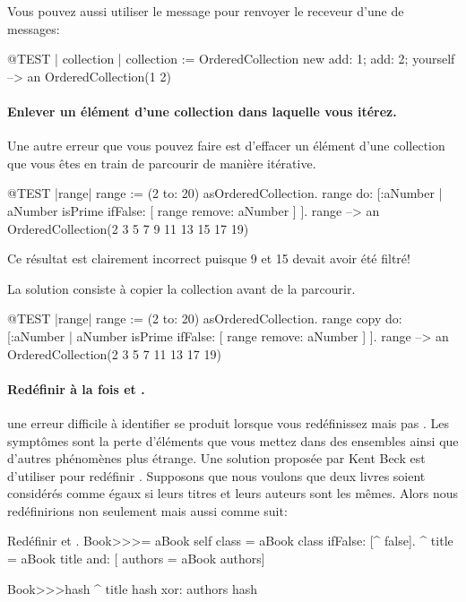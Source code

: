 \documentclass[a4paper,10pt,twoside]{book}
\begin{document}
Vous pouvez aussi utiliser le message  pour
renvoyer le receveur d'une  de messages:

\begin{code}{@TEST | collection |}
collection := OrderedCollection new add: 1; add: 2; yourself --> an OrderedCollection(1 2)
\end{code}

\paragraph{Enlever un \'el\'ement d'une collection dans laquelle vous it\'erez.}
Une autre erreur que vous pouvez faire est d'effacer un \'el\'ement d'une collection que vous \^etes en train de parcourir de mani\`ere it\'erative.
\begin{code}{@TEST |range|}
range := (2 to: 20) asOrderedCollection.
range do: [:aNumber | aNumber isPrime ifFalse: [ range remove: aNumber ] ].
range --> an OrderedCollection(2 3 5 7 9 11 13 15 17 19)
\end{code}
\noindent
Ce r\'esultat est clairement incorrect puisque 9 et 15 devait avoir \'et\'e
filtr\'e!

La solution consiste \`a copier la collection avant de la parcourir.
\begin{code}{@TEST |range|}
range := (2 to: 20) asOrderedCollection.
range copy do: [:aNumber | aNumber isPrime ifFalse: [ range remove: aNumber ] ].
range --> an OrderedCollection(2 3 5 7 11 13 17 19)
\end{code}

\paragraph{Red\'efinir \`a la fois \ct{=} et .}
une erreur difficile \`a identifier se produit lorsque vous
red\'efinissez \ct{=} mais pas . Les sympt\^omes sont
la perte d'\'el\'ements que vous mettez dans des ensembles  ainsi
que d'autres ph\'enom\`enes plus \'etrange. Une solution propos\'ee
par Kent Beck est d'utiliser  pour red\'efinir .
Supposons que nous voulons que deux livres soient consid\'er\'es comme
\'egaux si leurs titres et leurs auteurs sont les m\^emes.
Alors nous red\'efinirions non seulement
\ct{=} mais aussi  comme suit:

\begin{method}{Red\'efinir \lct{=} et .}
Book>>>= aBook
   self class = aBook class ifFalse: [^ false].
   ^ title = aBook title and: [ authors = aBook authors]

Book>>>hash 
   ^ title hash xor: authors hash
\end{method}
\end{document}
